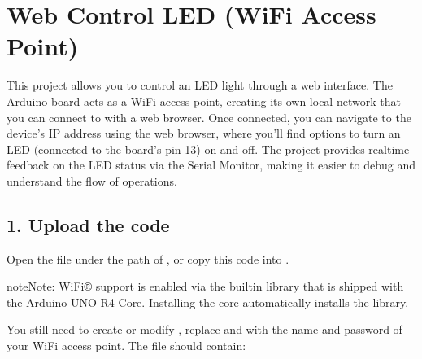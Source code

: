 \documentclass[a4paper,11pt,english]{sphinxmanual}
\begin{document}
\section{Web Control LED (WiFi Access Point)}
\label{\detokenize{Extension_Project/Web_Control_LED:web-control-led-wifi-access-point}}\label{\detokenize{Extension_Project/Web_Control_LED:ext-web-control-led}}\label{\detokenize{Extension_Project/Web_Control_LED::doc}}
\sphinxAtStartPar
This project allows you to control an LED light through a web interface. The Arduino board acts as a WiFi access point, creating its own local network that you can connect to with a web browser. Once connected, you can navigate to the device’s IP address using the web browser, where you’ll find options to turn an LED (connected to the board’s pin 13) on and off. The project provides real\sphinxhyphen{}time feedback on the LED status via the Serial Monitor, making it easier to debug and understand the flow of operations.


\subsection{1. Upload the code}
\label{\detokenize{Extension_Project/Web_Control_LED:upload-the-code}}
\sphinxAtStartPar
Open the  file under the path of , or copy this code into .

\begin{sphinxadmonition}{note}{Note:}
\sphinxAtStartPar
Wi\sphinxhyphen{}Fi® support is enabled via the built\sphinxhyphen{}in  library that is shipped with the Arduino UNO R4 Core. Installing the core automatically installs the  library.
\end{sphinxadmonition}

\sphinxAtStartPar
You still need to create or modify , replace  and  with the name and password of your WiFi access point. The file should contain:

\begin{sphinxVerbatim}[commandchars=\\\{\}]
\end{sphinxVerbatim}
\end{document}
